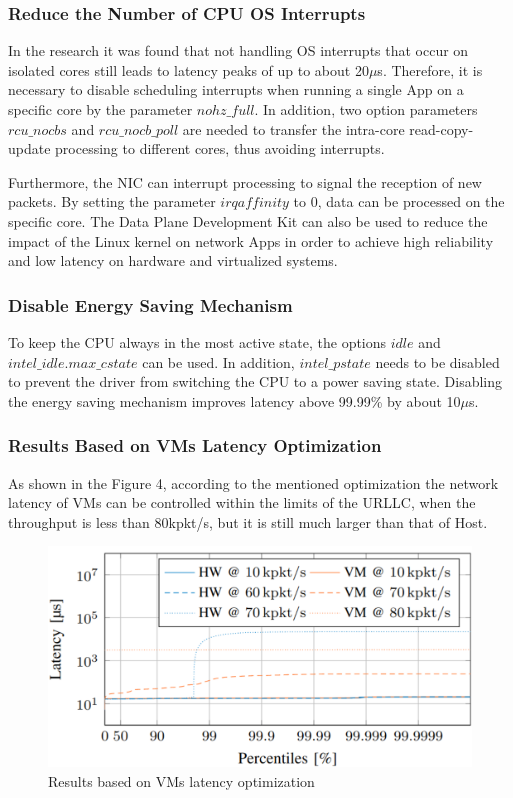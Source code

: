 \subsubsection{Reduce the Number of CPU OS Interrupts}
In the research\cite{b10} it was found that not handling OS interrupts that occur on
isolated cores still leads to latency peaks of up to about \si{20}{$\mu$s}.
Therefore, it is necessary to disable scheduling interrupts when running a single App
on a specific core by the parameter $nohz\_full$.
In addition, two option parameters $rcu\_nocbs$ and $rcu\_nocb\_poll$ are needed to
transfer the intra-core read-copy-update processing to different cores, thus avoiding interrupts\cite{b13}.

Furthermore, the NIC can interrupt processing to signal the reception of new packets.
By setting the parameter $irqaffinity$ to 0, data can be processed on the specific core.
The Data Plane Development Kit can also be used to reduce the impact of
the Linux kernel on network Apps in order to achieve high reliability and low latency
on hardware and virtualized systems\cite{b10}.


\subsubsection{Disable Energy Saving Mechanism}
To keep the CPU always in the most active state, the options $idle$
and $intel\_idle.max\_cstate$ can be used.
In addition, $intel\_pstate$ needs to be disabled to prevent the driver from switching the CPU
to a power saving state\cite{b13}.
Disabling the energy saving mechanism improves latency above 99.99\% by about \si{10}{$\mu$s}\cite{b12}.

\subsubsection{Results Based on VMs Latency Optimization}
As shown in the Figure 4, according to the mentioned optimization the network latency of VMs
can be controlled within the limits of the URLLC, when the throughput is less than 80kpkt/s, but it is
still much larger than that of Host.
\begin{figure}[h!]
    \centering
    \includegraphics[width=.3\textwidth]{pics/Optimization2}
    \caption{Results based on VMs latency optimization\cite{b13}}
\end{figure}

